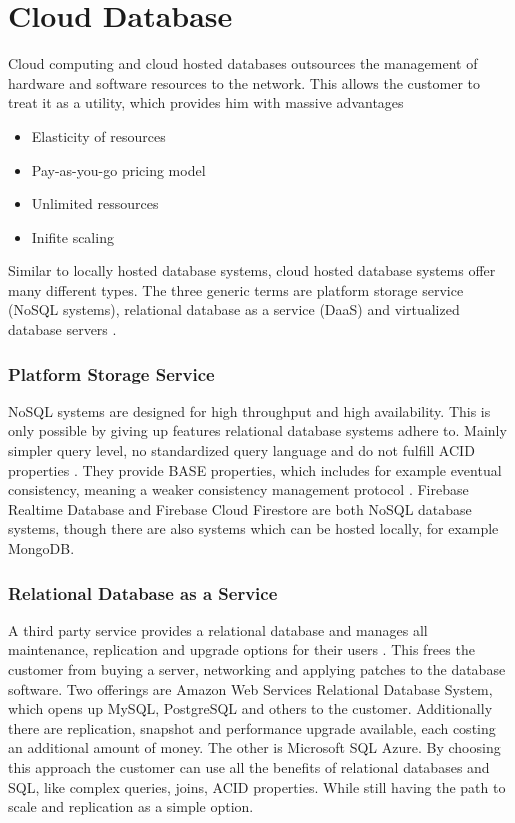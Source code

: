 \section{Cloud Database}

Cloud computing and cloud hosted databases outsources the management of hardware and software resources to the network. This allows the customer to treat it as a utility, which provides him with massive advantages \cite{zhao2013framework}
\begin{itemize}
    \item Elasticity of resources
    \item Pay-as-you-go pricing model
    \item Unlimited ressources
    \item Inifite scaling
\end{itemize}

Similar to locally hosted database systems, cloud hosted database systems offer many different types. The three generic terms are platform storage service (NoSQL systems), relational database as a service (DaaS) and virtualized database servers \cite{zhao2013framework}.

\subsubsection{Platform Storage Service}
NoSQL systems are designed for high throughput and high availability. This is only possible by giving up features relational database systems adhere to. Mainly simpler query level, no standardized query language and do not fulfill ACID properties \cite{zhao2013framework}. They provide BASE properties, which includes for example eventual consistency, meaning a weaker consistency management protocol \cite{zhao2013framework}. Firebase Realtime Database and Firebase Cloud Firestore are both NoSQL database systems, though there are also systems which can be hosted locally, for example MongoDB. 

\subsubsection{Relational Database as a Service}
A third party service provides a relational database and manages all maintenance, replication and upgrade options for their users \cite{zhao2013framework}. This frees the customer from buying a server, networking and applying patches to the database software. Two offerings are Amazon Web Services Relational Database System, which opens up MySQL, PostgreSQL and others to the customer. Additionally there are replication, snapshot and performance upgrade available, each costing an additional amount of money. The other is Microsoft SQL Azure. By choosing this approach the customer can use all the benefits of relational databases and SQL, like complex queries, joins, ACID properties. While still having the path to scale and replication as a simple option. 

